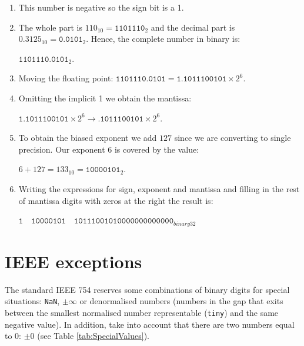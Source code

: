 \begin{enumerate}
    \item This number is negative so the sign bit is a 1.
    
    \item The whole part is $110_{10}=\texttt{1101110}_2$ and the decimal part is $0.3125_{10}=\texttt{0.0101}_2$. Hence, the complete number in binary is:
    
     $\texttt{1101110.0101}_2$. 
    
    \item Moving the floating point: $\texttt{1101110.0101}=\texttt{1.1011100101} \times 2^6$.
    
    \item Omitting the implicit 1 we obtain the mantissa: 
    
    $\texttt{1.1011100101}\times2^6 \rightarrow \texttt{.1011100101}\times2^6$.
    
    \item To obtain the biased exponent we add $127$ since we are converting to single precision. Our exponent $6$ is covered by the value:
    
     $6 + 127 = 133_{10}= \texttt{10000101}_2$. 
    
    \item Writing the expressions for sign, exponent and mantissa and filling in the rest of mantissa digits with zeros at the right the result is: 
    
    $\texttt{1}\quad \texttt{10000101}\quad \texttt{10111001010000000000000}_{binary32}$
    
\end{enumerate}






    \FloatBarrier    
    \section{IEEE exceptions}

The standard IEEE 754 reserves some combinations of binary digits for special situations: \texttt{NaN}, $\pm\infty$ or denormalised numbers (numbers in the gap that exits between the smallest normalised number representable (\texttt{tiny}) and the same negative value). In addition, take into account that there are two numbers equal to $0$: $\pm 0$ (see Table \ref{tab:SpecialValues}).

